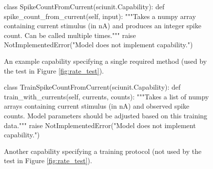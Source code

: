 \documentclass[11pt,letterpaper]{article}
\begin{document}
\begin{figure}
\begin{python}
class SpikeCountFromCurrent(sciunit.Capability):
  def spike_count_from_current(self, input): 
    """Takes a numpy array containing current stimulus (in nA) and
    produces an integer spike count. Can be called multiple times."""
    raise NotImplementedError("Model does not implement capability.")
\end{python}
\caption{An example capability specifying a single required method (used by the test in Figure \ref{fig:rate_test}).}
\label{fig:capability}
\vspace{-10px}
\end{figure}

\begin{figure}
\begin{python}
class TrainSpikeCountFromCurrent(sciunit.Capability):
  def train_with_currents(self, currents, counts):
    """Takes a list of numpy arrays containing current stimulus (in nA) and
    observed spike counts. Model parameters should be adjusted based on this
    training data."""
    raise NotImplementedError("Model does not implement capability.")
\end{python}
\caption{Another capability specifying a training protocol (not used by the test in Figure \ref{fig:rate_test}).}
\label{fig:training}
\vspace{-15px}
\end{figure}
\end{document}
